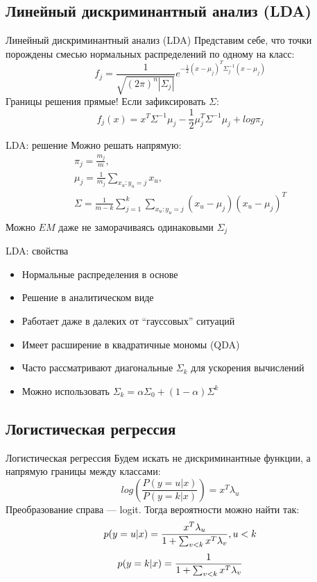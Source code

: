 \documentclass[14pt, fleqn, xcolor={dvipsnames, table}]{beamer}
\begin{document}
\subsection{Линейный дискриминантный анализ (LDA)}
\begin{frame}{Линейный дискриминантный анализ (LDA)}
Представим себе, что точки порождены смесью нормальных распределений по одному на класс:
$$
f_j = \frac{1}{\sqrt{(2\pi)^n|\Sigma_j|}}e^{-\frac{1}{2}(x - \mu_j)^T\Sigma^{-1}_j(x - \mu_j)}
$$
Границы решения прямые! Если зафиксировать $\Sigma$:
$$
f_j(x) = x^T\Sigma^{-1}\mu_j - \frac{1}{2}\mu_j^T\Sigma^{-1}\mu_j + log \pi_j
$$
\end{frame}
\begin{frame}{LDA: решение}
Можно решать напрямую:
$$\begin{array}{c}
\pi_j = \frac{m_j}{m},\\
\mu_j = \frac{1}{m_j}\sum_{x_u:y_u = j} x_u,\\
\Sigma = \frac{1}{m-k}\sum_{j=1}^k\sum_{x_u:y_u = j}(x_u - \mu_j)(x_u - \mu_j)^T \\
\end{array}$$
Можно $EM$ даже не заморачиваясь одинаковыми $\Sigma_j$
\end{frame}
\begin{frame}{LDA: свойства}
\begin{itemize}
  \item Нормальные распределения в основе
  \item Решение в аналитическом виде
  \item Работает даже в далеких от ``гауссовых'' ситуаций
  \item Имеет расширение в квадратичные мономы (QDA)
  \item Часто рассматривают диагональные $\Sigma_k$ для ускорения вычислений
  \item Можно использовать $\Sigma_k = \alpha\Sigma_0 + (1 - \alpha)\Sigma^k$
\end{itemize}
\end{frame}

\subsection{Логистическая регрессия}

\begin{frame}{Логистическая регрессия}
Будем искать не дискриминантные функции, а напрямую границы между классами:
$$
log\left(\frac{P(y=u|x)}{P(y=k|x)}\right) = x^T \lambda_{u}
$$
Преобразование справа --- logit. Тогда вероятности можно найти так:
$$
p(y=u|x) = {x^T \lambda_{u} \over 1 + \sum_{v < k} x^T\lambda_v}, u < k
$$
$$
p(y=k|x) = {1 \over 1 + \sum_{v < k} x^T\lambda_v}
$$
\end{frame}
\end{document}
